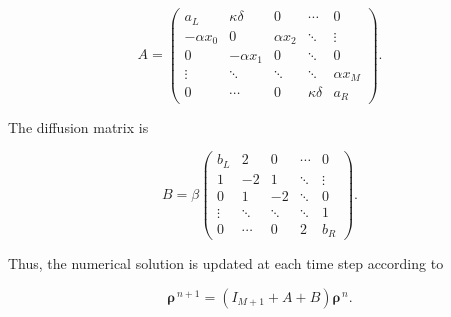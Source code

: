 \documentclass{article}
\begin{document}
$$
A
=
\begin{pmatrix}
a_L
&
\kappa\delta
&
0
&
\cdots
&
0
\\
-\alpha x_0
&
0
&
\alpha x_2
&
\ddots
&
\vdots
\\
0
&
-\alpha x_1
&
0
&
\ddots
&
0
\\
\vdots
&
\ddots
&
\ddots
&
\ddots
&
\alpha x_M
\\
0
&
\cdots
&
0
&
\kappa\delta
&
a_R
\end{pmatrix}.
$$

The diffusion matrix is

$$
B
=
\beta
\begin{pmatrix}
b_L
&
2
&
0
&
\cdots
&
0
\\
1
&
-2
&
1
&
\ddots
&
\vdots
\\
0
&
1
&
-2
&
\ddots
&
0
\\
\vdots
&
\ddots
&
\ddots
&
\ddots
&
1
\\
0
&
\cdots
&
0
&
2
&
b_R
\end{pmatrix}.
$$

\endgroup

Thus, the numerical solution is updated at each time step according to

$$
\boxed{
\boldsymbol{\rho}^{\,n+1}
=
\left(
I_{M+1}+A+B
\right)
\boldsymbol{\rho}^{\,n}
}.
$$
\end{document}
